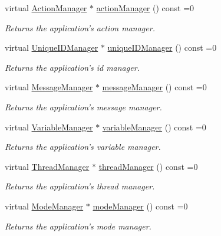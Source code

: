 \begin{DoxyCompactItemize}
virtual \hyperlink{class_core_1_1_action_manager}{\-Action\-Manager} $\ast$ \hyperlink{group___core_plugin_ga5e44e7795213bb2627acfa08a13f6a12}{action\-Manager} () const =0
\begin{DoxyCompactList}\small\item\em \-Returns the application's action manager. \end{DoxyCompactList}\item 
virtual \hyperlink{class_core_1_1_unique_i_d_manager}{\-Unique\-I\-D\-Manager} $\ast$ \hyperlink{group___core_plugin_ga4485869beb58de37e2e2e1a5fe0db6eb}{unique\-I\-D\-Manager} () const =0
\begin{DoxyCompactList}\small\item\em \-Returns the application's id manager. \end{DoxyCompactList}\item 
virtual \hyperlink{class_core_1_1_message_manager}{\-Message\-Manager} $\ast$ \hyperlink{group___core_plugin_gacc045be864edcb663fd9483b0690769e}{message\-Manager} () const =0
\begin{DoxyCompactList}\small\item\em \-Returns the application's message manager. \end{DoxyCompactList}\item 
virtual \hyperlink{class_core_1_1_variable_manager}{\-Variable\-Manager} $\ast$ \hyperlink{group___core_plugin_ga1e38c317f3da32d2cf97a92aad4da84f}{variable\-Manager} () const =0
\begin{DoxyCompactList}\small\item\em \-Returns the application's variable manager. \end{DoxyCompactList}\item 
virtual \hyperlink{class_core_1_1_thread_manager}{\-Thread\-Manager} $\ast$ \hyperlink{group___core_plugin_ga8620bdc9a630b0572af2a5fd908936c6}{thread\-Manager} () const =0
\begin{DoxyCompactList}\small\item\em \-Returns the application's thread manager. \end{DoxyCompactList}\item 
virtual \hyperlink{class_core_1_1_mode_manager}{\-Mode\-Manager} $\ast$ \hyperlink{group___core_plugin_gae36180b31ba67d38888143d60fceb220}{mode\-Manager} () const =0
\begin{DoxyCompactList}\small\item\em \-Returns the application's mode manager. \end{DoxyCompactList}\item 

\end{DoxyCompactItemize}
